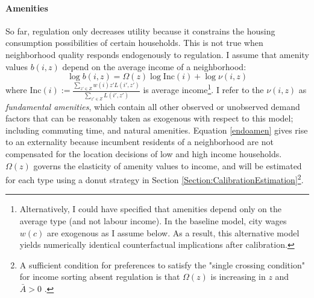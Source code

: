 \documentclass[12pt]{article}
\begin{document}
	\paragraph*{Amenities} So far, regulation only decreases utility because it constrains the housing consumption possibilities of certain households. This is not true when neighborhood quality responds endogenously to regulation. I assume that amenity values $b(i, z)$ depend on the average income of a neighborhood:
	\begin{equation}\label{endoamen}
		\log b(i, z) = \Omega(z)\log\text{Inc}(i) + \log \nu(i, z)
	\end{equation}
	 where $\text{Inc}(i) := \frac{\sum_{z' \in Z}w(i)z'L(i', z')}{\sum_{z' \in Z}L(i', z')}$ is average income\footnote{Alternatively, I could have specified that amenities depend only on the average type (and not labour income). In the baseline model, city wages $w(c)$ are exogenous as I assume below. As a result, this alternative model yields numerically identical counterfactual implications after calibration.}. I refer to the $\nu(i, z)$ as \textit{fundamental amenities}, which contain all other observed or unobserved demand factors that can be reasonably taken as exogenous with respect to this model; including commuting time, and natural amenities. Equation \eqref{endoamen} gives rise to an externality because incumbent residents of a neighborhood are not compensated for the location decisions of low and high income households. $\Omega(z)$ governs the elasticity of amenity values to income, and will be estimated for each type using a donut strategy in Section \ref{Section:CalibrationEstimation}\footnote{A sufficient condition for preferences to satisfy the "single crossing condition" for income sorting absent regulation is that $\Omega(z)$ is increasing in $z$ and $\bar{A} > 0$ \citep{ineffTiebout}.}. 
\end{document}
